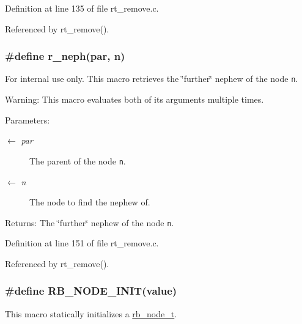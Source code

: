 Definition at line 135 of file rt\_\-remove.c.

Referenced by rt\_\-remove().\hypertarget{group__dbprim__rbtree_ga51}{
\subsubsection[r\_\-neph]{\setlength{\rightskip}{0pt plus 5cm}\#define r\_\-neph(par, n)}}
\label{group__dbprim__rbtree_ga51}


\begin{Desc}
\item[For internal use only.]
This macro retrieves the \char`\"{}further\char`\"{} nephew of the node {\tt n}.

\begin{Desc}
\item[Warning:]This macro evaluates both of its arguments multiple times.\end{Desc}
\begin{Desc}
\item[Parameters:]
\begin{description}
\item[\mbox{$\leftarrow$} {\em par}]The parent of the node {\tt n}. \item[\mbox{$\leftarrow$} {\em n}]The node to find the nephew of.\end{description}
\end{Desc}
\begin{Desc}
\item[Returns:]The \char`\"{}further\char`\"{} nephew of the node {\tt n}.\end{Desc}
\end{Desc}


Definition at line 151 of file rt\_\-remove.c.

Referenced by rt\_\-remove().\hypertarget{group__dbprim__rbtree_ga30}{
\subsubsection[RB\_\-NODE\_\-INIT]{\setlength{\rightskip}{0pt plus 5cm}\#define RB\_\-NODE\_\-INIT(value)}}
\label{group__dbprim__rbtree_ga30}


This macro statically initializes a \hyperlink{group__dbprim__rbtree_ga1}{rb\_\-node\_\-t}.

